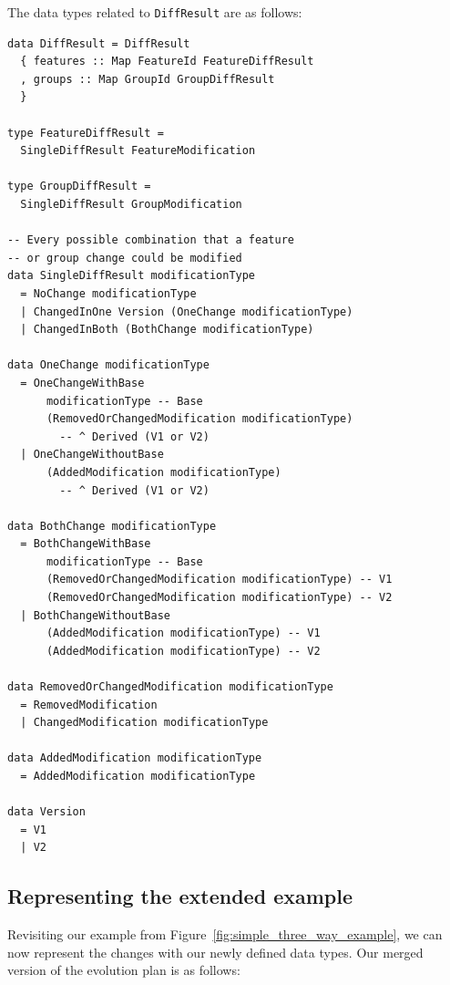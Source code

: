 \documentclass[a4paper,english]{ifimaster}
\begin{document}
The data types related to \texttt{DiffResult} are as follows:

\begin{verbatim}
data DiffResult = DiffResult
  { features :: Map FeatureId FeatureDiffResult
  , groups :: Map GroupId GroupDiffResult
  }

type FeatureDiffResult =
  SingleDiffResult FeatureModification

type GroupDiffResult =
  SingleDiffResult GroupModification

-- Every possible combination that a feature
-- or group change could be modified
data SingleDiffResult modificationType
  = NoChange modificationType
  | ChangedInOne Version (OneChange modificationType)
  | ChangedInBoth (BothChange modificationType)

data OneChange modificationType
  = OneChangeWithBase
      modificationType -- Base
      (RemovedOrChangedModification modificationType)
        -- ^ Derived (V1 or V2)
  | OneChangeWithoutBase
      (AddedModification modificationType) 
        -- ^ Derived (V1 or V2)

data BothChange modificationType
  = BothChangeWithBase
      modificationType -- Base
      (RemovedOrChangedModification modificationType) -- V1
      (RemovedOrChangedModification modificationType) -- V2
  | BothChangeWithoutBase
      (AddedModification modificationType) -- V1
      (AddedModification modificationType) -- V2

data RemovedOrChangedModification modificationType
  = RemovedModification
  | ChangedModification modificationType

data AddedModification modificationType
  = AddedModification modificationType

data Version
  = V1
  | V2
\end{verbatim}

\subsection{Representing the extended example}%
\label{sub:representing_the_extended_example}

Revisiting our example from Figure~\ref{fig:simple_three_way_example}, we can now represent the changes with our newly defined data types. Our merged version of the evolution plan is as follows:
\end{document}
